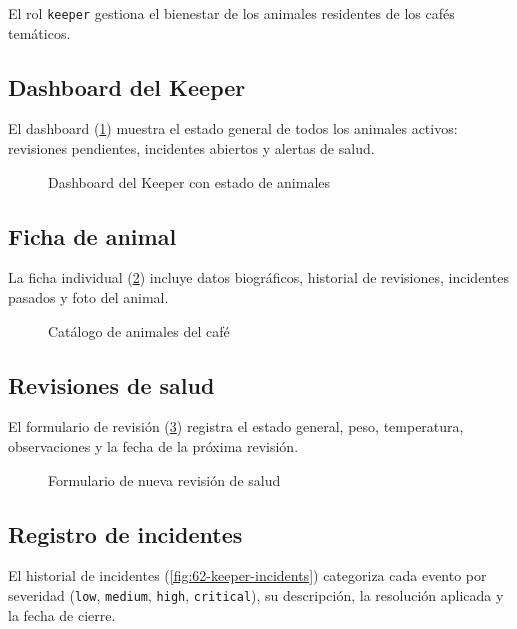 \documentclass[12pt,a4paper,twoside,openright]{report}
\begin{document}
El rol \texttt{keeper} gestiona el bienestar de los animales residentes de los cafés
temáticos.

\subsection{Dashboard del Keeper}
El dashboard (\cref{fig:58-keeper-dashboard}) muestra el estado general de todos
los animales activos: revisiones pendientes, incidentes abiertos y alertas de salud.

\begin{figure}[H]
  \centering
  \fbox{\rule{0pt}{6cm}\rule{12cm}{0pt}}
  \caption{Dashboard del Keeper con estado de animales}
  \label{fig:58-keeper-dashboard}
\end{figure}

\subsection{Ficha de animal}
La ficha individual (\cref{fig:59-keeper-animals}) incluye datos biográficos,
historial de revisiones, incidentes pasados y foto del animal.

\begin{figure}[H]
  \centering
  \fbox{\rule{0pt}{6cm}\rule{12cm}{0pt}}
  \caption{Catálogo de animales del café}
  \label{fig:59-keeper-animals}
\end{figure}

\subsection{Revisiones de salud}
El formulario de revisión (\cref{fig:61-keeper-health-check-crear}) registra el
estado general, peso, temperatura, observaciones y la fecha de la próxima revisión.

\begin{figure}[H]
  \centering
  \fbox{\rule{0pt}{6cm}\rule{12cm}{0pt}}
  \caption{Formulario de nueva revisión de salud}
  \label{fig:61-keeper-health-check-crear}
\end{figure}

\subsection{Registro de incidentes}
El historial de incidentes (\cref{fig:62-keeper-incidents}) categoriza cada evento
por severidad (\texttt{low}, \texttt{medium}, \texttt{high}, \texttt{critical}),
su descripción, la resolución aplicada y la fecha de cierre.
\end{document}
